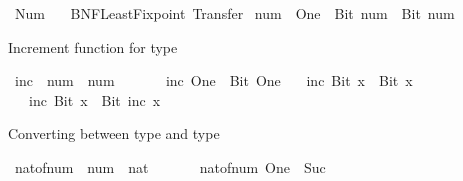 %
\begin{isabellebody}%
%
%
\isadelimdocument
%
\endisadelimdocument
%
\isatagdocument
%
\isamarkuptrue%
%
\endisatagdocument
{\isafolddocument}%
%
\isadelimdocument
%
\endisadelimdocument
%
\isadelimtheory
%
\endisadelimtheory
%
\isatagtheory
{}\isamarkupfalse%
\ Num\isanewline
\ \ \ BNF{\isacharunderscore}{\kern0pt}Least{\isacharunderscore}{\kern0pt}Fixpoint\ Transfer\isanewline
{}%
\endisatagtheory
{\isafoldtheory}%
%
\isadelimtheory
%
\endisadelimtheory
%
\isadelimdocument
%
\endisadelimdocument
%
\isatagdocument
%
\isamarkuptrue%
%
\endisatagdocument
{\isafolddocument}%
%
\isadelimdocument
%
\endisadelimdocument
{}\isamarkupfalse%
\ num\ {\isacharequal}{\kern0pt}\ One\ {\isacharbar}{\kern0pt}\ Bit{}\ num\ {\isacharbar}{\kern0pt}\ Bit{}\ num%
\begin{isamarkuptext}%
Increment function for type %
\end{isamarkuptext}\isamarkuptrue%
\isamarkupfalse%
\ inc\ {\isacharcolon}{\kern0pt}{\isacharcolon}{\kern0pt}\ {\isachardoublequoteopen}num\ {\isasymRightarrow}\ num{\isachardoublequoteclose}\isanewline
\ \ \isanewline
\ \ \ \ {\isachardoublequoteopen}inc\ One\ {\isacharequal}{\kern0pt}\ Bit{}\ One{\isachardoublequoteclose}\isanewline
\ \ {\isacharbar}{\kern0pt}\ {\isachardoublequoteopen}inc\ {\isacharparenleft}{\kern0pt}Bit{}\ x{\isacharparenright}{\kern0pt}\ {\isacharequal}{\kern0pt}\ Bit{}\ x{\isachardoublequoteclose}\isanewline
\ \ {\isacharbar}{\kern0pt}\ {\isachardoublequoteopen}inc\ {\isacharparenleft}{\kern0pt}Bit{}\ x{\isacharparenright}{\kern0pt}\ {\isacharequal}{\kern0pt}\ Bit{}\ {\isacharparenleft}{\kern0pt}inc\ x{\isacharparenright}{\kern0pt}{\isachardoublequoteclose}%
\begin{isamarkuptext}%
Converting between type  and type %
\end{isamarkuptext}\isamarkuptrue%
\isamarkupfalse%
\ nat{\isacharunderscore}{\kern0pt}of{\isacharunderscore}{\kern0pt}num\ {\isacharcolon}{\kern0pt}{\isacharcolon}{\kern0pt}\ {\isachardoublequoteopen}num\ {\isasymRightarrow}\ nat{\isachardoublequoteclose}\isanewline
\ \ \isanewline
\ \ \ \ {\isachardoublequoteopen}nat{\isacharunderscore}{\kern0pt}of{\isacharunderscore}{\kern0pt}num\ One\ {\isacharequal}{\kern0pt}\ Suc\ {}{\isachardoublequoteclose}\isanewline

\end{isabellebody}

